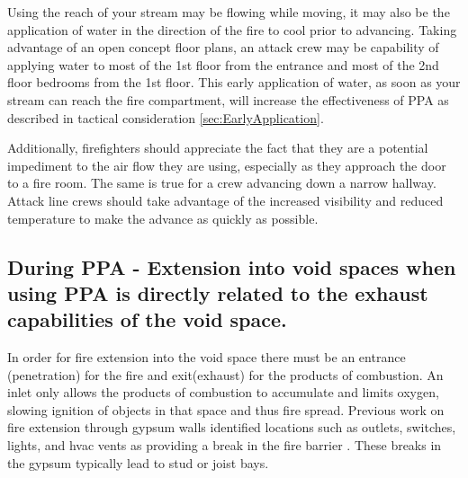 \documentclass{article}
\begin{document}
Using the reach of your stream may be flowing while moving, it may also be the application of water in the direction of the fire to cool prior to advancing. Taking advantage of an open concept floor plans, an attack crew may be capability of applying water to most of the 1st floor from the entrance and most of the 2nd floor bedrooms from the 1st floor.  This early application of water, as soon as your stream can reach the fire compartment, will increase the effectiveness of PPA as described in tactical consideration \ref{sec:EarlyApplication}.

Additionally, firefighters should appreciate the fact that they are a potential impediment to the air flow they are using, especially as they approach the door to a fire room. The same is true for a crew advancing down a narrow hallway. Attack line crews should take advantage of the increased visibility and reduced temperature to make the advance as quickly as possible.

\subsection{During PPA - Extension into void spaces when using PPA is directly related to the exhaust capabilities of the void space.} \label{TC:Extension_Into_Voids}
In order for fire extension into the void space there must be an entrance (penetration) for the fire and exit(exhaust) for the products of combustion. An inlet only allows the products of combustion to accumulate and limits oxygen, slowing ignition of objects in that space and thus fire spread. Previous work on fire extension through gypsum walls identified locations such as outlets, switches, lights, and hvac vents as providing a break in the fire barrier\cite{DHS2011} \cite{WeinschenkStrongVentFlowFires}.  These breaks in the gypsum typically lead to stud or joist bays. 
\end{document}

